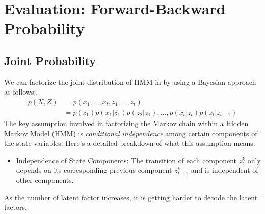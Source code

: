 \section{Evaluation: Forward-Backward Probability}




\subsection{Joint Probability}
We can factorize the joint distribution of HMM in  by using a Bayesian approach as follows:. 
\begin{align}
	p(X,Z) &= p(x_1,\dots,x_t, z_1,\dots,z_t)\\ 
		   &= p(z_1)p(x_1|z_1)p(z_2|z_1),\dots,p(x_{t}|z_{t})p(z_{t}|z_{t-1})
\end{align}
The key assumption involved in factorizing the Markov chain within a Hidden Markov Model (HMM) is \textit{conditional independence} among certain components of the state variables. Here's a detailed breakdown of what this assumption means:
\begin{itemize}
	\item Independence of State Components: The transition of each component $z_t^k$ only depends on its corresponding previous component $z_{t-1}^k$ and is independent of other components.
\end{itemize}
As the number of latent factor increases, it is getting harder to decode the latent factors. 

